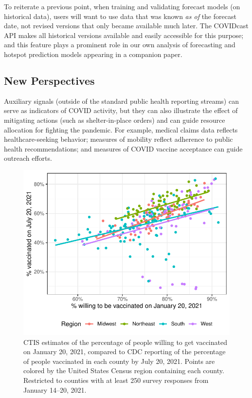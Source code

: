 \documentclass[9pt,twocolumn,twoside,lineno]{pnas-new}
\begin{document}
To reiterate a previous point, when training and validating forecast models (on
historical data), users will want to use data that was known \textit{as of} the
forecast date, not revised versions that only became available much later. The
COVIDcast API makes all historical versions available and easily accessible for
this purpose; and this feature plays a prominent role in our own analysis of
forecasting and hotspot prediction models appearing in a companion paper.

\subsection{New Perspectives}

Auxiliary signals (outside of the standard public health reporting streams) can
serve as indicators of COVID activity, but they can also illustrate the effect
of mitigating actions (such as shelter-in-place orders) and can guide resource
allocation for fighting the pandemic. For example, medical claims data reflects
healthcare-seeking behavior; measures of mobility reflect adherence to public
health recommendations; and measures of COVID vaccine acceptance can guide
outreach efforts.

\begin{figure}
  \centering
  \includegraphics[width=\columnwidth]{fig/vaccine-intent-compare.pdf}
  \caption{CTIS estimates of the percentage of people willing to get vaccinated
    on January 20, 2021, compared to CDC reporting of the percentage of people
    vaccinated in each county by July 20, 2021. Points are colored by the United
    States Census region containing each county. Restricted to counties with at
    least 250 survey responses from January 14--20, 2021.}
  \label{fig:vaccine-intent-compare}
\end{figure}
\end{document}
